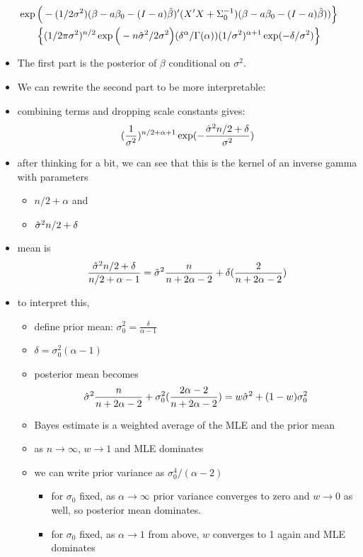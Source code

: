 \begin{itemize}[leftmargin=0pt]
\begin{multline*}
          \exp\Big( -(1/2\sigma^2) (\beta - a\beta_0 - (I-a)\hat{\beta})' (X'X + \Sigma_0^{-1})(\beta - a\beta_0 - (I-a)\hat{\beta})) \Big\} \\
    \Big\{(1/2\pi\sigma^2)^{n/2} 
           \exp\Big(- n\hat{\sigma}^2/2\sigma^2 \Big) 
           (\delta^\alpha/\Gamma(\alpha)) (1/\sigma^2)^{\alpha+1} \exp(-\delta/\sigma^2) \Big\}
  \end{multline*}
\begin{itemize}
\item The first part is the posterior of $\beta$ conditional on $\sigma^2$.
\item We can rewrite the second part to be more interpretable:
\item combining terms and dropping scale constants gives:
  \[(\frac{1}{\sigma^2})^{n/2 + \alpha + 1} \exp(- \frac{\hat{\sigma}^2 n/2 + \delta}{\sigma^2})\]
\item after thinking for a bit, we can see that this is the kernel of an inverse
         gamma with parameters
\begin{itemize}
\item $n/2+\alpha$ and
\item $\hat{\sigma}^2 n/2 + \delta$
\end{itemize}
\item mean is
  \[\frac{\hat{\sigma}^2 n/2 + \delta}{n/2 + \alpha - 1}
  = \hat{\sigma}^2 \frac{n}{n + 2\alpha - 2} + \delta(\frac{2}{n + 2\alpha - 2})\]
\item to interpret this,
\begin{itemize}
\item define prior mean: $\sigma_0^2 = \frac{\delta}{\alpha - 1}$
\item $\delta = \sigma^2_0 (\alpha - 1)$
\item posterior mean becomes 
  \[\hat{\sigma}^2 \frac{n}{n + 2\alpha - 2} + \sigma_0^2(\frac{2 \alpha - 2}{n + 2\alpha - 2}) 
  = w \hat{\sigma}^2 + (1-w) \sigma_0^2\]
\item Bayes estimate is a weighted average of the MLE and the
           prior mean
\item as $n \to \infty$, $w \to 1$ and MLE dominates
\item we can write prior variance as $\sigma_0^4 / (\alpha - 2)$
\begin{itemize}
\item for $\sigma_0$ fixed, as $\alpha \to \infty$ prior
             variance converges to zero and $w \to 0$ as well, so
             posterior mean dominates.
\item for $\sigma_0$ fixed, as $\alpha \to 1$ from above, $w$
             converges to 1 again and MLE dominates
\end{itemize}
\end{itemize}
\end{itemize}
\end{itemize}

